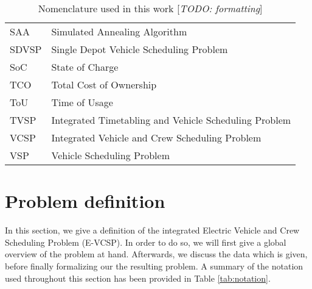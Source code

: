 \documentclass[]{article}
\newcommand{\todo}[1]{{\color{red}[\textit{TODO: #1}]}}
\begin{document}
\begin{table}
\begin{tabular}{ll}
    SAA                                       & Simulated Annealing Algorithm                         \\
    SDVSP                                     & Single Depot Vehicle Scheduling Problem               \\
    SoC                                       & State of Charge                                       \\
    TCO                                       & Total Cost of Ownership                               \\
    ToU                                       & Time of Usage                                         \\
    TVSP                                      & Integrated Timetabling and Vehicle Scheduling Problem \\
    VCSP                                      & Integrated Vehicle and Crew Scheduling Problem        \\
    VSP                                       & Vehicle Scheduling Problem                            \\
    \bottomrule
  \end{tabular}
  \label{tab:nomenclature}
  \caption{Nomenclature used in this work \todo{formatting}}
\end{table}

\section{Problem definition}
\label{sec:problem_def}
In this section, we give a definition of the integrated Electric Vehicle and Crew Scheduling Problem (E-VCSP). In order to do so, we will first give a global overview of the problem at hand. Afterwards, we discuss the data which is given, before finally formalizing our the resulting problem. A summary of the notation used throughout this section has been provided in Table \ref{tab:notation}.
\end{document}
